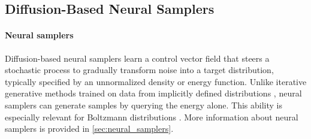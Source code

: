 \documentclass[]{fairmeta}
\theoremstyle{remark}
\begin{document}
\subsection{Diffusion-Based Neural Samplers}

\paragraph{Neural samplers}
Diffusion-based neural samplers learn a control vector field that steers a stochastic process to gradually transform noise into a target distribution, typically specified by an unnormalized density or energy function.
Unlike iterative generative methods trained on data from implicitly defined distributions \citep{sohl2015deep,ho2020denoising,lipman2022flow,albergo2023stochastic}, neural samplers can generate samples by querying the energy alone.
This ability is especially relevant for Boltzmann distributions \citep{zhang2021path,berner2022optimal,vargas2023denoising,havens2025adjoint}.
More information about neural samplers is provided in \cref{sec:neural_samplers}.
\end{document}
